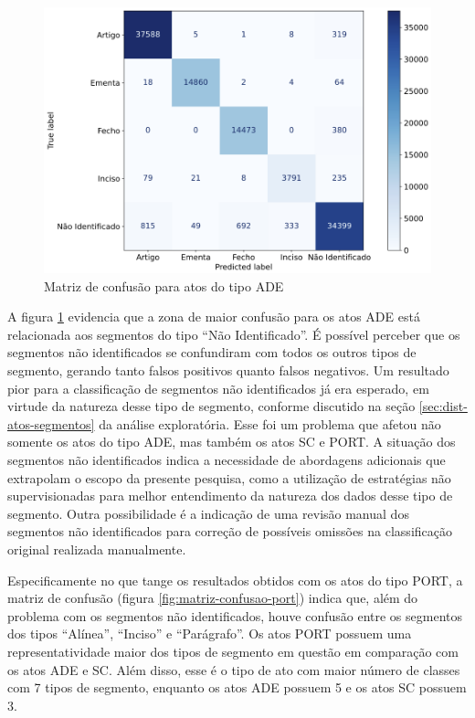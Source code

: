 \begin{figure}[h]
	\caption{Matriz de confusão para atos do tipo ADE}
	\center
	\label{fig:matriz-confusao-ade}
	\includegraphics[scale=0.45]{resultados/matriz-confusao-ade.png}
	\fdp
\end{figure}

A figura \ref{fig:matriz-confusao-ade} evidencia que a zona de maior confusão para os atos ADE está relacionada aos segmentos do tipo ``Não Identificado''. É possível perceber que os segmentos não identificados se confundiram com todos os outros tipos de segmento, gerando tanto falsos positivos quanto falsos negativos. Um resultado pior para a classificação de segmentos não identificados já era esperado, em virtude da natureza desse tipo de segmento, conforme discutido na seção \ref{sec:dist-atos-segmentos} da análise exploratória. Esse foi um problema que afetou não somente os atos do tipo ADE, mas também os atos SC e PORT. A situação dos segmentos não identificados indica a necessidade de abordagens adicionais que extrapolam o escopo da presente pesquisa, como a utilização de estratégias não supervisionadas para melhor entendimento da natureza dos dados desse tipo de segmento. Outra possibilidade é a indicação de uma revisão manual dos segmentos não identificados para correção de possíveis omissões na classificação original realizada manualmente.

Especificamente no que tange os resultados obtidos com os atos do tipo PORT, a matriz de confusão (figura \ref{fig:matriz-confusao-port}) indica que, além do problema com os segmentos não identificados, houve confusão entre os segmentos dos tipos ``Alínea'', ``Inciso'' e ``Parágrafo''. Os atos PORT possuem uma representatividade maior dos tipos de segmento em questão em comparação com os atos ADE e SC. Além disso, esse é o tipo de ato com maior número de classes com 7 tipos de segmento, enquanto os atos ADE possuem 5 e os atos SC possuem 3.

